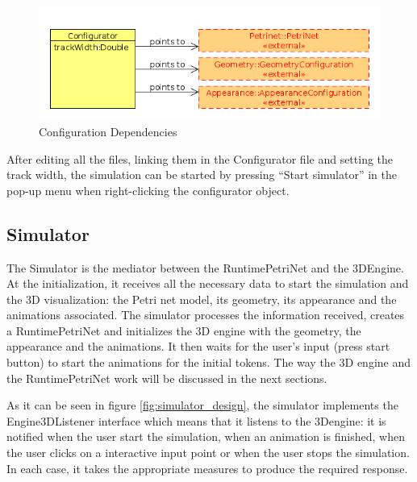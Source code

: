 \begin{figure}[ht]
   \begin{center}
       \includegraphics[scale=0.50]{image/configuration_dependencies.png}
       \caption{Configuration Dependencies}
       \label{fig:configuration_dependencies}
       \end{center}
   \end{figure}

After editing all the files, linking them in the Configurator file and setting the track width, the
simulation can be started by pressing ``Start simulator'' in the pop-up menu when right-clicking the configurator object.

\subsection{Simulator}
The Simulator is the mediator between the RuntimePetriNet and the 3DEngine. At the initialization, it receives all the necessary data to start the simulation and the 3D visualization: the Petri net model, its geometry, its appearance and the animations associated. The simulator processes
the information received, creates a RuntimePetriNet and initializes the 3D engine with the
geometry, the appearance and the animations. It then waits for the user's input (press start button) to start the animations for the  initial tokens. The way the 3D engine and the RuntimePetriNet work will
be discussed in the next sections.

As it can be seen in figure \ref{fig:simulator_design}, the simulator implements the Engine3DListener
interface which means that it listens to the 3Dengine: it is notified when the
user start the simulation, when an animation is finished, when the user clicks
on a interactive input point or when the user stops the simulation. In each
case, it takes the appropriate measures to produce the required response.

